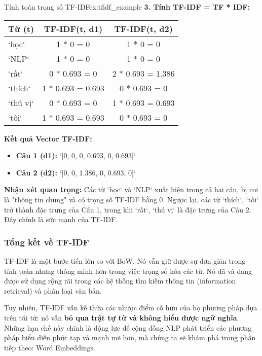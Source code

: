 \begin{example}{Tính toán trọng số TF-IDF}{ex:tfidf_example}
    \textbf{3. Tính TF-IDF = TF * IDF:}
    \begin{center}
    \begin{tabular}{|l|c|c|}
        \hline
        \textbf{Từ (t)} & \textbf{TF-IDF(t, d1)} & \textbf{TF-IDF(t, d2)} \\
        \hline
        `học` & 1 * 0 = 0 & 1 * 0 = 0 \\
        `NLP` & 1 * 0 = 0 & 1 * 0 = 0 \\
        `rất` & 0 * 0.693 = 0 & 2 * 0.693 = 1.386 \\
        `thích` & 1 * 0.693 = 0.693 & 0 * 0.693 = 0 \\
        `thú vị` & 0 * 0.693 = 0 & 1 * 0.693 = 0.693 \\
        `tôi` & 1 * 0.693 = 0.693 & 0 * 0.693 = 0 \\
        \hline
    \end{tabular}
    \end{center}
    
    \textbf{Kết quả Vector TF-IDF:}
    \begin{itemize}
        \item \textbf{Câu 1 (d1):} `[0, 0, 0, 0.693, 0, 0.693]`
        \item \textbf{Câu 2 (d2):} `[0, 0, 1.386, 0, 0.693, 0]`
    \end{itemize}
    
    \textbf{Nhận xét quan trọng:} Các từ `học` và `NLP` xuất hiện trong cả hai câu, bị coi là "thông tin chung" và có trọng số TF-IDF bằng 0. Ngược lại, các từ `thích`, `tôi` trở thành đặc trưng của Câu 1, trong khi `rất`, `thú vị` là đặc trưng của Câu 2. Đây chính là sức mạnh của TF-IDF.
\end{example}

\subsubsection{Tổng kết về TF-IDF}
TF-IDF là một bước tiến lớn so với BoW. Nó vẫn giữ được sự đơn giản trong tính toán nhưng thông minh hơn trong việc trọng số hóa các từ. Nó đã và đang được sử dụng rộng rãi trong các hệ thống tìm kiếm thông tin (information retrieval) và phân loại văn bản.

Tuy nhiên, TF-IDF vẫn kế thừa các nhược điểm cố hữu của họ phương pháp dựa trên túi từ: nó vẫn \textbf{bỏ qua trật tự từ và không hiểu được ngữ nghĩa}. Những hạn chế này chính là động lực để cộng đồng NLP phát triển các phương pháp biểu diễn phức tạp và mạnh mẽ hơn, mà chúng ta sẽ khám phá trong phần tiếp theo: Word Embeddings.